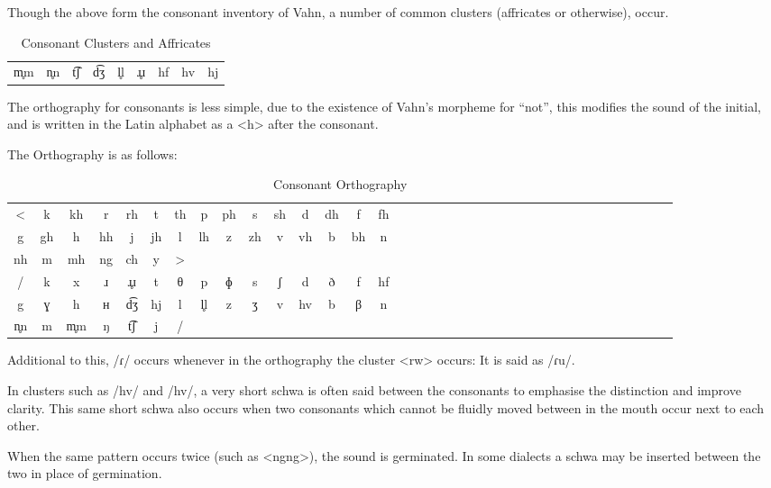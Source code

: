 \documentclass{article}
\begin{document}
Though the above form the consonant inventory of Vahn, a number of common clusters (affricates or
otherwise), occur.

\begin{table}[H]
    \centering
    \begin{tabular}{c|c|c|c|c|c|c|c|c}
        m̥m &
        n̥n &
        t͡ʃ &
        d͡ʒ &
        l̥l &
        ɹ̥ɹ &
        hf &
        hv &
        hj 
    \end{tabular}
    \caption{Consonant Clusters and Affricates}
    \label{Consonant Clusters and Affricates}
\end{table}

The orthography for consonants is less simple, due to the existence of Vahn's morpheme for ``not'',
this modifies the sound of the initial, and is written in the Latin alphabet as a <h> after the
consonant.

\noindent The Orthography is as follows:

\begin{table}[H]
    \centering
    \begin{tabular}{ccccccccccccccccccccccccccccccccccccc}
        < & k & kh & r & rh & t & th & p & ph & s & sh & d & dh & f & fh \\
        g & gh  & h & hh & j & jh & l & lh & z & zh & v & vh & b & bh & n \\
        nh & m & mh & ng & ch & y & > \\
        / & k & x & ɹ & ɹ̥ɹ & t & θ & p & ɸ & s & ʃ & d & ð & f & hf\\
        g & ɣ & h & ʜ & d͡ʒ & hj & l & l̥l & z & ʒ & v & hv & b & β & n\\
        n̥n & m & m̥m & ŋ & t͡ʃ & j & /
    \end{tabular}
    \caption{Consonant Orthography}
    \label{Consonant Orthography}
\end{table}

Additional to this, /ɾ/ occurs whenever in the orthography the cluster <rw> occurs: It is said as
/ɾu/.

In clusters such as /hv/ and /hv/, a very short schwa is often said between the consonants to
emphasise the distinction and improve clarity. This same short schwa also occurs when two consonants
which cannot be fluidly moved between in the mouth occur next to each other.

When the same pattern occurs twice (such as <ngng>), the sound is germinated. In some dialects a
schwa may be inserted between the two in place of germination.
\end{document}
